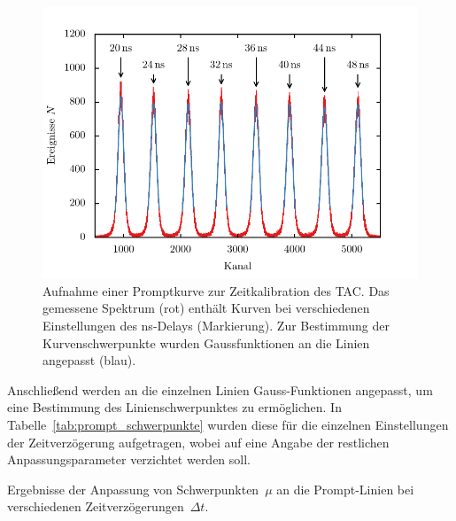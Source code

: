 \documentclass[11pt, a4paper]{article}
\numberwithin{equation}{section}
\begin{document}
\begin{figure}[h]
	\centering
	\includegraphics{./figures/prompt_curve_fits.pdf}
	\caption{Aufnahme einer Promptkurve zur Zeitkalibration des TAC. Das gemessene Spektrum (rot) enthält Kurven bei verschiedenen Einstellungen des \si{ns}-Delays (Markierung). Zur Bestimmung der Kurvenschwerpunkte wurden Gaussfunktionen an die Linien angepasst (blau).}
	\label{fig:promptkurven}
\end{figure}
Anschließend werden an die einzelnen Linien Gauss-Funktionen angepasst, um eine Bestimmung des Linienschwerpunktes zu ermöglichen.
In Tabelle~\ref{tab:prompt_schwerpunkte} wurden diese für die einzelnen Einstellungen der Zeitverzögerung aufgetragen, wobei auf eine Angabe der restlichen Anpassungsparameter verzichtet werden soll.
\begin{table}[h]
	\centering
	
	\caption{Ergebnisse der Anpassung von Schwerpunkten~$\mu$ an die Prompt-Linien bei verschiedenen Zeitverzögerungen~$\Delta t$.}
	\label{tab:prompt_schwerpunkte}
\end{table}
\end{document}
